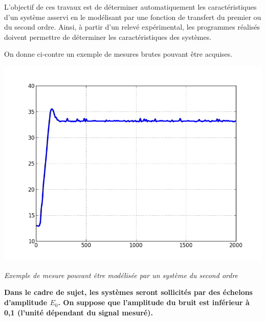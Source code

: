 \documentclass[10pt]{article}
\newif\ifprof
\begin{document}


\ifprof
\begin{center}
\large{\textit{Éléments de corrigé}}
\end{center}
\else
\fi



\ifprof
\else
\begin{minipage}[c]{.48\linewidth}

\begin{obj}
L'objectif de ces travaux est de déterminer automatiquement les caractéristiques d'un système asservi en le modélisant par une fonction de transfert du premier ou du second ordre. Ainsi, à partir d'un relevé expérimental, les programmes réalisés doivent permettre de déterminer les caractéristiques des systèmes.
\end{obj}

On donne ci-contre un exemple de mesures brutes pouvant être acquises.
\end{minipage}\hfill
\begin{minipage}[c]{.48\linewidth}
\begin{center}
\includegraphics[width=.95\textwidth]{images/ordre2}

\textit{Exemple de mesure pouvant être modélisée par un système du second ordre}
\end{center}
\end{minipage}

\vspace{.3cm}

\textbf{Dans le cadre de sujet, les systèmes seront sollicités par des échelons d'amplitude $E_0$. On suppose que l'amplitude du bruit est inférieur à 0,1 (l'unité dépendant du signal mesuré).} 
\fi
\end{document}

